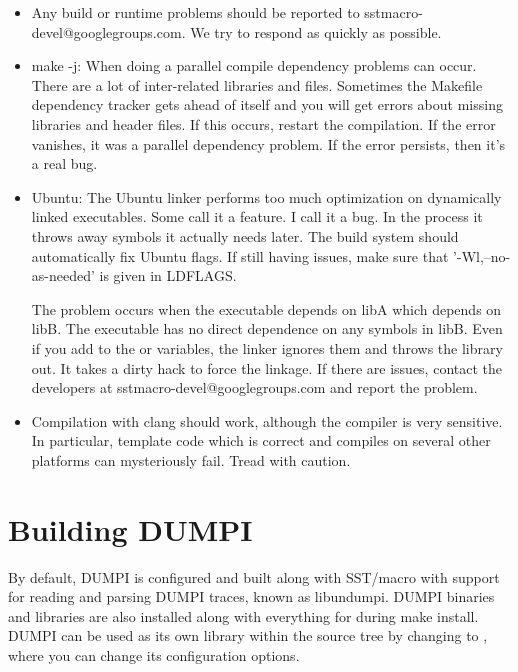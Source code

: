 \begin{itemize}
\item Any build or runtime problems should be reported to sstmacro-devel@googlegroups.com.  We try to respond as quickly as possible.
\item make -j: When doing a parallel compile dependency problems can occur.  
There are a lot of inter-related libraries and files.  
Sometimes the Makefile dependency tracker gets ahead of itself and you will get errors about missing libraries and header files.
If this occurs, restart the compilation.  If the error vanishes, it was a parallel dependency problem.
If the error persists, then it's a real bug.

\item Ubuntu: The Ubuntu linker performs too much optimization on dynamically linked executables.
Some call it a feature.  I call it a bug.
In the process it throws away symbols it actually needs later. The build system should automatically fix Ubuntu flags.
If still having issues, make sure that '-Wl,--no-as-needed' is given in LDFLAGS.

The problem occurs when the executable depends on libA which depends on libB.
The executable has no direct dependence on any symbols in libB.
Even if you add  to the  or  variables,
the linker ignores them and throws the library out.
It takes a dirty hack to force the linkage.
If there are issues, contact the developers at sstmacro-devel@googlegroups.com and report the problem. 

\item Compilation with clang should work, although the compiler is very sensitive.  
In particular, template code which is correct and compiles on several other platforms can mysteriously fail.  Tread with caution.
\end{itemize}

\section{Building DUMPI}
\label{sec:building:dumpi}

By default, DUMPI is configured and built along with SST/macro with support for reading and parsing DUMPI traces, known as libundumpi.  
DUMPI binaries and libraries are also installed along with everything for \sstmacro during make install.   
DUMPI can be used as its own library within the \sstmacro source tree by changing to , 
where you can change its configuration options.  

